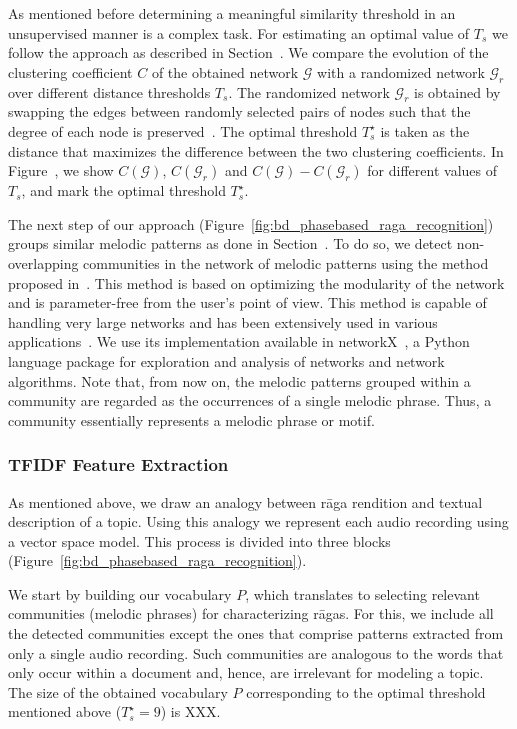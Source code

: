 As mentioned before determining a meaningful similarity threshold in an unsupervised manner is a complex task. For estimating an optimal value of $T_s$ we follow the approach as described in Section~. We compare the evolution of the clustering coefficient $C$ of the obtained network $\mathcal{G}$ with a randomized network $\mathcal{G}_r$ over different distance thresholds $T_s$. The randomized network $\mathcal{G}_r$ is obtained by swapping the edges between randomly selected pairs of nodes such that the degree of each node is preserved~\cite{maslov2002specificity}. The optimal threshold $T_{s}^\star$ is taken as the distance that maximizes the difference between the two clustering coefficients.  In Figure~, we show $C(\mathcal{G})$, $C(\mathcal{G}_r)$ and $C(\mathcal{G})-C(\mathcal{G}_r)$ for different values of $T_{s}$, and mark the optimal threshold $T_{s}^\star$.

The next step of our approach (Figure~\ref{fig:bd_phasebased_raga_recognition}) groups similar melodic patterns as done in Section~. To do so, we detect non-overlapping communities in the network of melodic patterns using the method proposed in~\cite{blondel2008fast}. This method is based on optimizing the modularity of the network and is parameter-free from the user's point of view. This method is capable of handling very large networks and has been extensively used in various applications~\cite{fortunato2010community}. We use its implementation available in networkX~\cite{hagberg-2008-exploring}, a Python language package for exploration and analysis of networks and network algorithms. Note that, from now on, the melodic patterns grouped within a community are regarded as the occurrences of a single melodic phrase. Thus, a community essentially represents a melodic phrase or motif.

\subsubsection{TFIDF Feature Extraction}
\label{sec:vsm_feature_extraction_TFID_computation}

As mentioned above, we draw an analogy between r\={a}ga rendition and textual description of a topic. Using this analogy we represent each audio recording using a vector space model. This process is divided into three blocks (Figure~\ref{fig:bd_phasebased_raga_recognition}).

We start by building our vocabulary $P$, which translates to selecting relevant communities (melodic phrases) for characterizing r\={a}gas. For this, we include all the detected communities except the ones that comprise patterns extracted from only a single audio recording. Such communities are analogous to the words that only occur within a document and, hence, are irrelevant for modeling a topic. The size of the obtained vocabulary $P$ corresponding to the optimal threshold mentioned above ($T_{s}^\star=9$) is XXX.

